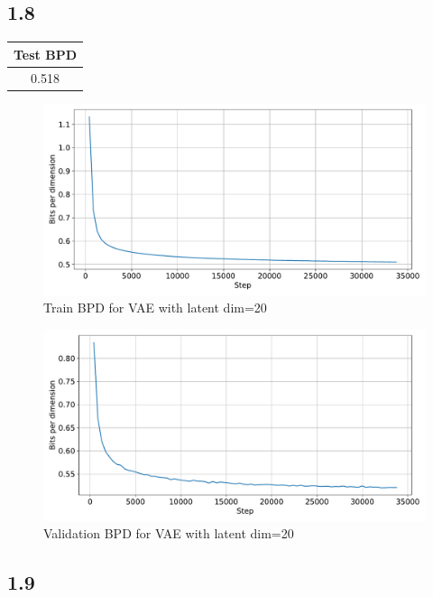 \documentclass{article}
\begin{document}
\newpage
\subsection*{1.8}

\begin{table}[h]
    \centering
    \begin{tabular}{|c|}
    \hline
    \textbf{Test BPD} \\
    \hline
    0.518 \\
    \hline
    \end{tabular}
\end{table}

\begin{figure}[h]
    \centering
    \includegraphics[width=\textwidth]{images/train_bpd.pdf}
    \caption{Train BPD for VAE with latent dim=20}
    \label{fig:train_bpd}
\end{figure}
\begin{figure}
    \centering
    \includegraphics[width=\textwidth]{images/val_bpd.pdf}
    \caption{Validation BPD for VAE with latent dim=20}
    \label{fig:val_bpd}
\end{figure}

\subsection*{1.9}
\end{document}
